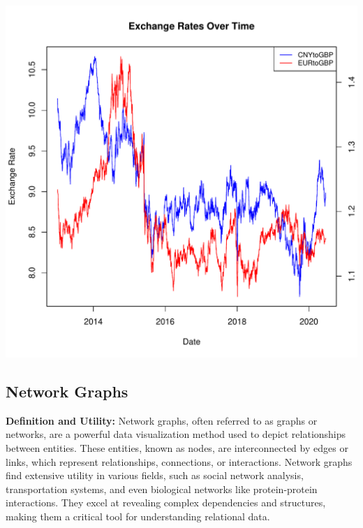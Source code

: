 \documentclass{article}\usepackage[]{graphicx}\usepackage[]{xcolor}
\makeatletter
\def\maxwidth{ %
  \ifdim\Gin@nat@width>\linewidth
    \linewidth
  \else
    \Gin@nat@width
  \fi
}
\newenvironment{knitrout}{}{} %
\makeatother
\begin{document}
\begin{knitrout}
\color{fgcolor}
\includegraphics[width=\maxwidth]{figure/unnamed-chunk-4-1} 
\end{knitrout}


\subsection{Network Graphs}
\textbf{Definition and Utility:}
Network graphs, often referred to as graphs or networks, are a powerful data visualization method used to depict relationships between entities. These entities, known as nodes, are interconnected by edges or links, which represent relationships, connections, or interactions. Network graphs find extensive utility in various fields, such as social network analysis, transportation systems, and even biological networks like protein-protein interactions. They excel at revealing complex dependencies and structures, making them a critical tool for understanding relational data.
\end{document}
